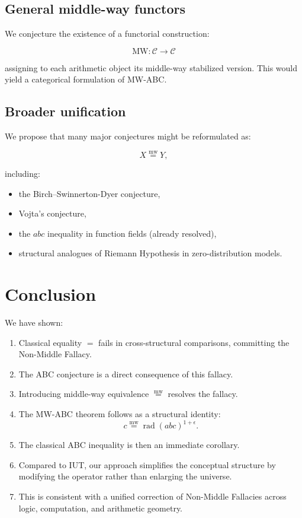 \documentclass[11pt]{article}
\newcommand{\mweq}{\mathrel{\overset{\mathrm{mw}}{=}}}
\theoremstyle{definition}
\theoremstyle{remark}
\begin{document}
\subsection{General middle-way functors}

We conjecture the existence of a functorial construction:

\[
  \mathrm{MW}: \mathcal{C} \to \mathcal{C}
\]

assigning to each arithmetic object its middle-way stabilized version.
This would yield a categorical formulation of MW-ABC.

\subsection{Broader unification}

We propose that many major conjectures might be reformulated as:

\[
  X \mweq Y,
\]

including:

\begin{itemize}
  \item the Birch–Swinnerton-Dyer conjecture,
  \item Vojta’s conjecture,
  \item the $abc$ inequality in function fields (already resolved),
  \item structural analogues of Riemann Hypothesis in zero-distribution
        models.
\end{itemize}

\section{Conclusion}

We have shown:

\begin{enumerate}
  \item Classical equality $=$ fails in cross-structural comparisons,
        committing the Non-Middle Fallacy.
  \item The ABC conjecture is a direct consequence of this fallacy.
  \item Introducing middle-way equivalence $\mweq$ resolves the fallacy.
  \item The MW-ABC theorem follows as a structural identity:
        \[
           c \mweq \operatorname{rad}(abc)^{1+\epsilon}.
        \]
  \item The classical ABC inequality is then an immediate corollary.
  \item Compared to IUT, our approach simplifies the conceptual structure
        by modifying the operator rather than enlarging the universe.
  \item This is consistent with a unified correction of Non-Middle
        Fallacies across logic, computation, and arithmetic geometry.
\end{enumerate}
\end{document}
